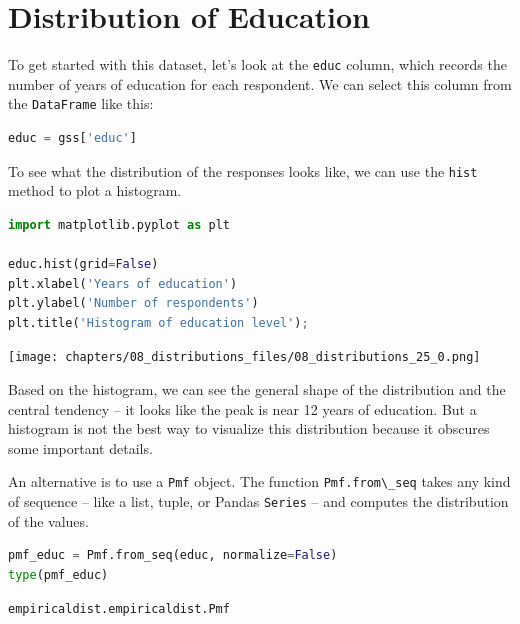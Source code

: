 \section{Distribution of Education}\label{distribution-of-education}

To get started with this dataset, let's look at the
\passthrough{\lstinline!educ!} column, which records the number of years
of education for each respondent. We can select this column from the
\passthrough{\lstinline!DataFrame!} like this:

\begin{lstlisting}[language=Python,style=source]
educ = gss['educ']
\end{lstlisting}

To see what the distribution of the responses looks like, we can use the
\passthrough{\lstinline!hist!} method to plot a histogram.

\begin{lstlisting}[language=Python,style=source]
import matplotlib.pyplot as plt

educ.hist(grid=False)
plt.xlabel('Years of education')
plt.ylabel('Number of respondents')
plt.title('Histogram of education level');
\end{lstlisting}

\begin{center}
\texttt{[image: chapters/08\_distributions\_files/08\_distributions\_25\_0.png]}
\end{center}

Based on the histogram, we can see the general shape of the distribution
and the central tendency -- it looks like the peak is near 12 years of
education. But a histogram is not the best way to visualize this
distribution because it obscures some important details.

An alternative is to use a \passthrough{\lstinline!Pmf!} object. The
function \passthrough{\lstinline!Pmf.from\_seq!} takes any kind of
sequence -- like a list, tuple, or Pandas
\passthrough{\lstinline!Series!} -- and computes the distribution of the
values.

\begin{lstlisting}[language=Python,style=source]
pmf_educ = Pmf.from_seq(educ, normalize=False)
type(pmf_educ)
\end{lstlisting}

\begin{lstlisting}[style=output]
empiricaldist.empiricaldist.Pmf
\end{lstlisting}

